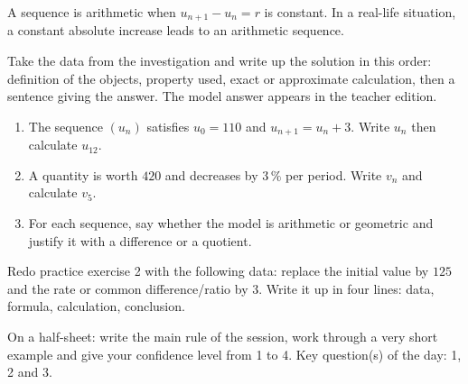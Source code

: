     \begin{traceecrite}A sequence is arithmetic when $u_{n+1}-u_n=r$ is constant. In a real-life situation, a constant absolute increase leads to an arithmetic sequence.\end{traceecrite}

    \begin{exemple}
    Take the data from the investigation and write up the solution in this order: definition of the objects, property used, exact or approximate calculation, then a sentence giving the answer. The model answer appears in the teacher edition.
    \end{exemple}

    \begin{exercice}[-- essential]
    \begin{enumerate}\item The sequence $(u_n)$ satisfies $u_0=110$ and $u_{n+1}=u_n+3$. Write $u_n$ then calculate $u_{12}$.\item A quantity is worth $420$ and decreases by $3\,\%$ per period. Write $v_n$ and calculate $v_5$.\item For each sequence, say whether the model is arithmetic or geometric and justify it with a difference or a quotient.\end{enumerate}
    \end{exercice}


    \begin{dm}Redo practice exercise 2 with the following data: replace the initial value by $125$ and the rate or common difference/ratio by $3$. Write it up in four lines: data, formula, calculation, conclusion.\end{dm}

    \begin{sortie}On a half-sheet: write the main rule of the session, work through a very short example and give your confidence level from 1 to 4. Key question(s) of the day: 1, 2 and 3.\end{sortie}

